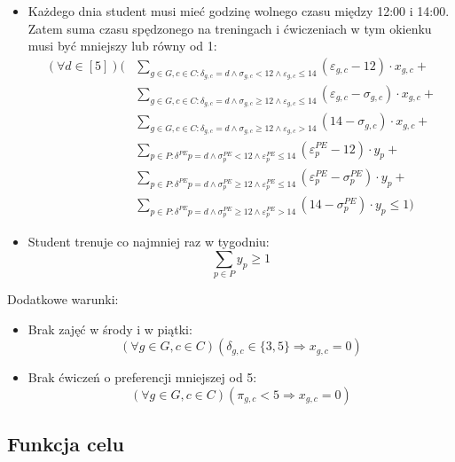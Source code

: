 \documentclass{article}
\begin{document}
\begin{itemize}
    \item Każdego dnia student musi mieć godzinę wolnego czasu między 12:00 i 14:00. Zatem suma czasu spędzonego na treningach i ćwiczeniach w tym okienku musi być mniejszy lub równy od 1:
    \begin{align*}
     (\forall d \in [5]) ( 
&\sum_ {g \in G, c \in C : \delta_{g,c} = d \land \sigma_{g,c} <   12 \land \varepsilon_{g,c} \leq 14} (\varepsilon_{g,c} - 12)                 \cdot x_{g,c} + \\  
    &\sum_ {g \in G, c \in C : \delta_{g,c} = d \land \sigma_{g,c} \geq  12 \land \varepsilon_{g,c} \leq 14} (\varepsilon_{g,c}  - \sigma_{g,c}) \cdot x_{g,c} + \\
    &\sum_ {g \in G, c \in C : \delta_{g,c} = d \land \sigma_{g,c} \geq  12 \land \varepsilon_{g,c} >  14} (14 - \sigma_{g,c})               \cdot x_{g,c} +\\
    &\sum_ {p \in P             : \delta^{PE}{p} = d \land \sigma^{PE}_{p} <   12 \land \varepsilon^{PE}_{p} \leq 14} (\varepsilon^{PE}_{p} - 12)                 \cdot y_{p}   + \\
    &\sum_ {p \in P             : \delta^{PE}{p} = d \land \sigma^{PE}_{p} \geq  12 \land \varepsilon^{PE}_{p} \leq 14} (\varepsilon^{PE}_{p}  - \sigma^{PE}_{p}) \cdot y_{p}   + \\
    &\sum_ {p \in P             : \delta^{PE}{p} = d \land \sigma^{PE}_{p} \geq  12 \land \varepsilon^{PE}_{p} >  14} (14 - \sigma^{PE}_{p})               \cdot y_{p}   \leq 1)   
    \end{align*}

\item Student trenuje co najmniej raz w tygodniu:
$$\sum_{p \in P} y_{p} \geq 1$$

\end{itemize}

Dodatkowe warunki:
\begin{itemize}
    \item Brak zajęć w środy i w piątki:
    $$\left( \forall g \in G, c \in C \right) (\delta_{g,c} \in \{3,5\} \Rightarrow x_{g,c} = 0)$$
    \item Brak ćwiczeń o preferencji mniejszej od 5:
    $$\left( \forall g \in G, c \in C \right) (\pi_{g,c} < 5 \Rightarrow x_{g,c} = 0)$$
\end{itemize}

\subsection{Funkcja celu}
\end{document}
